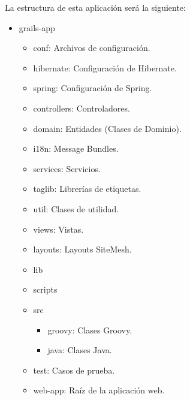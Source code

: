La estructura de esta aplicación será la siguiente:

\begin{itemize}
	\item grails-app
\begin{itemize}
	\item conf: Archivos de configuración.
	\item hibernate: Configuración de Hibernate.
	\item spring: Configuración de Spring.
	\item controllers: Controladores.
	\item domain: Entidades (Clases de Dominio).
	\item i18n: Message Bundles.
	\item services: Servicios.
	\item taglib: Librerías de etiquetas.
	\item util: Clases de utilidad.
	\item views: Vistas.
	\item layouts: Layouts SiteMesh.
	\item lib
	\item scripts
	\item src
	\begin{itemize}
		\item groovy: Clases Groovy.
		\item java: Clases Java.
	\end{itemize}
	\item test: Casos de prueba.
	\item web-app: Raíz de la aplicación web.
	\end{itemize}
\end{itemize}



